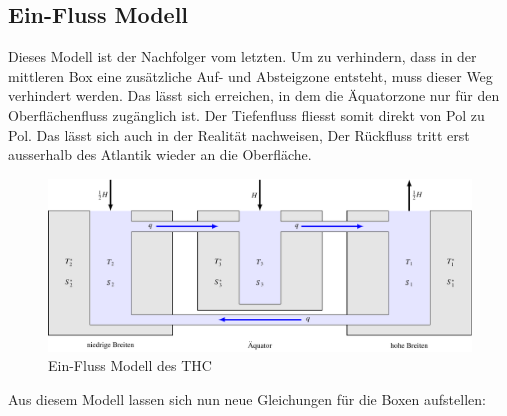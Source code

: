 
\subsection{Ein-Fluss Modell} 

Dieses Modell ist der Nachfolger vom letzten. 
Um zu verhindern, dass in der mittleren Box eine zusätzliche Auf- und Absteigzone entsteht, muss dieser Weg verhindert werden. Das lässt sich erreichen, in dem die Äquatorzone nur für den Oberflächenfluss zugänglich ist. Der Tiefenfluss fliesst somit direkt von Pol zu Pol. 
Das lässt sich auch in der Realität nachweisen, Der Rückfluss tritt erst ausserhalb des Atlantik wieder an die Oberfläche.

\begin{figure}
	\centering
	\includegraphics[width=14cm]{thermohalin/tikz/3b1f.pdf}
	\caption{Ein-Fluss Modell des THC}
	\label{thermohalin:3b1f}
\end{figure}

Aus diesem Modell lassen sich nun neue Gleichungen für die Boxen aufstellen:

